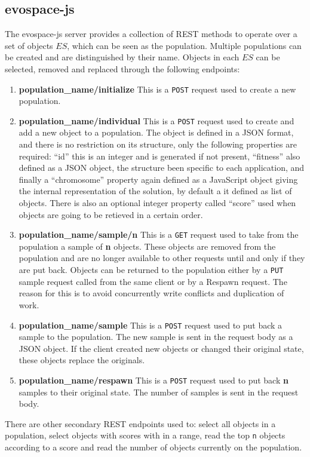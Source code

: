 \subsection{evospace-js}
 \label{sec:evospace}
The evospace-js server provides a collection of REST methods  
to operate over a set of objects $ES$, which can be seen as the 
population. Multiple populations can be created and are 
distinguished by their name. Objects in each $ES$ 
can be selected, removed and replaced through the 
following endpoints:
\begin{enumerate}
    \item {\bf population\_name/initialize} 
    This is a {\tt POST} request used to create a new population.
    \item {\bf population\_name/individual} 
    This is a {\tt POST} request used to create and add a new object
    to a population. The object is defined in a JSON format, 
    and there is no restriction on its structure, only 
    the following properties are required: ``id'' this is an 
    integer and is generated if not present, ``fitness'' also defined 
    as a JSON object, the structure been specific to each application, 
    and finally a ``chromosome'' property again defined as
    a JavaScript object giving the internal representation of 
    the solution, by default a it defined as list of objects. 
    There is also an optional integer property called 
    ``score'' used when objects are going to be retieved in a certain order.
    \item {\bf population\_name/sample/n}
    This is a {\tt GET}  request used to take from the population a 
    sample of {\bf n} objects. These objects are removed from the 
    population and are no longer available
    to other requests until and only if they are put back. 
    Objects can be returned to the population 
    either by a {\tt PUT} sample request called from the same 
    client or by a Respawn request. The reason for 
    this is to avoid concurrently write conflicts and duplication of work.
    \item {\bf population\_name/sample}
    This is a {\tt POST} request used to put back a sample to the population.
    The new sample is sent in the request body as a JSON object. 
    If the client created new objects or 
    changed their original state, these objects replace the originals. 
    \item {\bf population\_name/respawn}
    This is a {\tt POST} request used to put back {\bf n} samples to their 
    original state. The number of samples is sent in the request body. 
\end{enumerate}
There are other secondary REST endpoints used to: select all objects in a 
population, select objects with scores with in a range, read the 
top {\tt n} objects according to a score and read the number of
objects currently on the population.      

